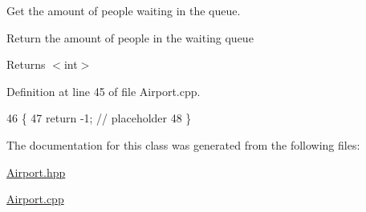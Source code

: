 Get the amount of people waiting in the queue. 

Return the amount of people in the waiting queue

\begin{DoxyReturn}{Returns}
$<$int$>$ 
\end{DoxyReturn}


Definition at line 45 of file Airport.\+cpp.


\begin{DoxyCode}
46 \{
47     \textcolor{keywordflow}{return} -1; \textcolor{comment}{// placeholder}
48 \}
\end{DoxyCode}


The documentation for this class was generated from the following files\+:\begin{DoxyCompactItemize}
\item 
\hyperlink{Airport_8hpp}{Airport.\+hpp}\item 
\hyperlink{Airport_8cpp}{Airport.\+cpp}\end{DoxyCompactItemize}
